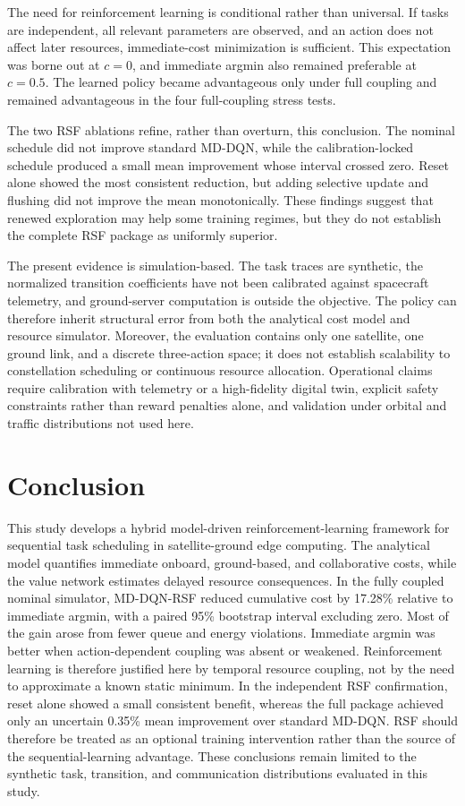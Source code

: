 \documentclass[lettersize,journal]{IEEEtran}
\begin{document}
The need for reinforcement learning is conditional rather than universal. If tasks are independent, all relevant parameters are observed, and an action does not affect later resources, immediate-cost minimization is sufficient. This expectation was borne out at $c=0$, and immediate argmin also remained preferable at $c=0.5$. The learned policy became advantageous only under full coupling and remained advantageous in the four full-coupling stress tests.

The two RSF ablations refine, rather than overturn, this conclusion. The nominal schedule did not improve standard MD-DQN, while the calibration-locked schedule produced a small mean improvement whose interval crossed zero. Reset alone showed the most consistent reduction, but adding selective update and flushing did not improve the mean monotonically. These findings suggest that renewed exploration may help some training regimes, but they do not establish the complete RSF package as uniformly superior.

The present evidence is simulation-based. The task traces are synthetic, the normalized transition coefficients have not been calibrated against spacecraft telemetry, and ground-server computation is outside the objective. The policy can therefore inherit structural error from both the analytical cost model and resource simulator. Moreover, the evaluation contains only one satellite, one ground link, and a discrete three-action space; it does not establish scalability to constellation scheduling or continuous resource allocation. Operational claims require calibration with telemetry or a high-fidelity digital twin, explicit safety constraints rather than reward penalties alone, and validation under orbital and traffic distributions not used here.

\section{Conclusion}

This study develops a hybrid model-driven reinforcement-learning framework for sequential task scheduling in satellite-ground edge computing. The analytical model quantifies immediate onboard, ground-based, and collaborative costs, while the value network estimates delayed resource consequences. In the fully coupled nominal simulator, MD-DQN-RSF reduced cumulative cost by 17.28\% relative to immediate argmin, with a paired 95\% bootstrap interval excluding zero. Most of the gain arose from fewer queue and energy violations. Immediate argmin was better when action-dependent coupling was absent or weakened. Reinforcement learning is therefore justified here by temporal resource coupling, not by the need to approximate a known static minimum. In the independent RSF confirmation, reset alone showed a small consistent benefit, whereas the full package achieved only an uncertain 0.35\% mean improvement over standard MD-DQN. RSF should therefore be treated as an optional training intervention rather than the source of the sequential-learning advantage. These conclusions remain limited to the synthetic task, transition, and communication distributions evaluated in this study.
\end{document}
